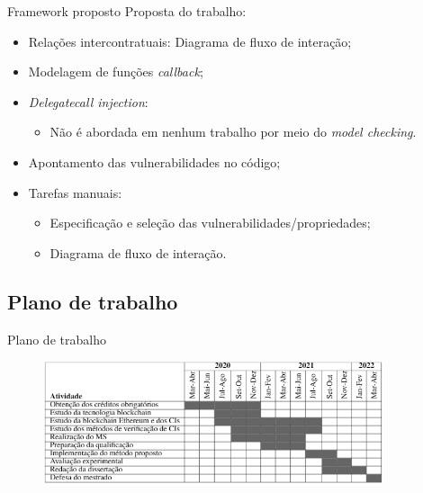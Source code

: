 \begin{frame}{Framework proposto}
	Proposta do trabalho:
	\begin{itemize}
		\item Relações intercontratuais: Diagrama de fluxo de interação;
		\item Modelagem de funções \textit{callback};
		\item \textit{Delegatecall injection}:
		\begin{itemize}
			\item Não é abordada em nenhum trabalho por meio do \textit{model checking}.
		\end{itemize}
		\item Apontamento das vulnerabilidades no código;
		\item Tarefas manuais:
		\begin{itemize}
			\item Especificação e seleção das vulnerabilidades/propriedades;
			\item Diagrama de fluxo de interação.
		\end{itemize}
	\end{itemize}
\end{frame}

\subsection{Plano de trabalho}
\begin{frame}{Plano de trabalho}
    \begin{figure}[ht]
    \centering
    \includegraphics[width=10cm]{figuras/proposta/plano_de_trabalho.png}
    \end{figure}
\end{frame}
